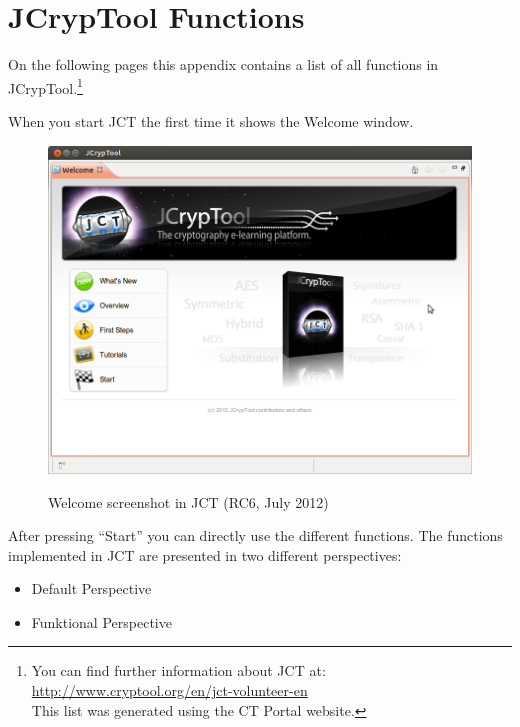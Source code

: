 \section{JCrypTool Functions}
\label{s:appendix-function-overview-JCT}

\noindent On the following pages this appendix contains a list of all
functions in JCrypTool.\footnote{%
  You can find further information about JCT at:
  \url{http://www.cryptool.org/en/jct-volunteer-en} \\
  This list was generated using the CT Portal website.}

\noindent When you start JCT the first time it shows the Welcome window.

\begin{figure}[hb]
\begin{center}
\includegraphics[scale=0.45, angle=0] {figures/JCT-Welcome-EN}
\hypertarget{Welcome-Screenshot-JCT}{}
\caption{Welcome screenshot in JCT (RC6, July 2012)} 
\label{Welcome-Screenshot-JCT}
\end{center}
\end{figure}
After pressing ``Start'' you can directly use the different functions.
The functions implemented in JCT are presented in two different perspectives:
\begin{itemize}
   \item Default Perspective
   \item Funktional Perspective
 \end{itemize}

